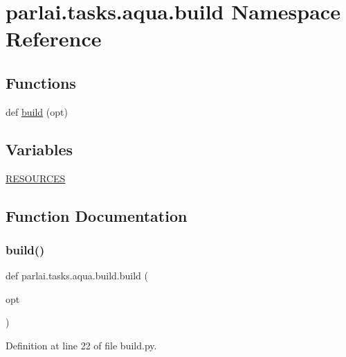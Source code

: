\hypertarget{namespaceparlai_1_1tasks_1_1aqua_1_1build}{}\section{parlai.\+tasks.\+aqua.\+build Namespace Reference}
\label{namespaceparlai_1_1tasks_1_1aqua_1_1build}
\subsection*{Functions}
\begin{DoxyCompactItemize}
\item 
def \hyperlink{namespaceparlai_1_1tasks_1_1aqua_1_1build_a6b4f6ce85b0fc6e988403a0def089b5a}{build} (opt)
\end{DoxyCompactItemize}
\subsection*{Variables}
\begin{DoxyCompactItemize}
\item 
\hyperlink{namespaceparlai_1_1tasks_1_1aqua_1_1build_a936890e1870494761c677c9fdda3a230}{R\+E\+S\+O\+U\+R\+C\+ES}
\end{DoxyCompactItemize}


\subsection{Function Documentation}
\mbox{\label{namespaceparlai_1_1tasks_1_1aqua_1_1build_a6b4f6ce85b0fc6e988403a0def089b5a}} 
\subsubsection{\texorpdfstring{build()}{build()}}
{\footnotesize\ttfamily def parlai.\+tasks.\+aqua.\+build.\+build (\begin{DoxyParamCaption}\item[{}]{opt }\end{DoxyParamCaption})}



Definition at line 22 of file build.\+py.


